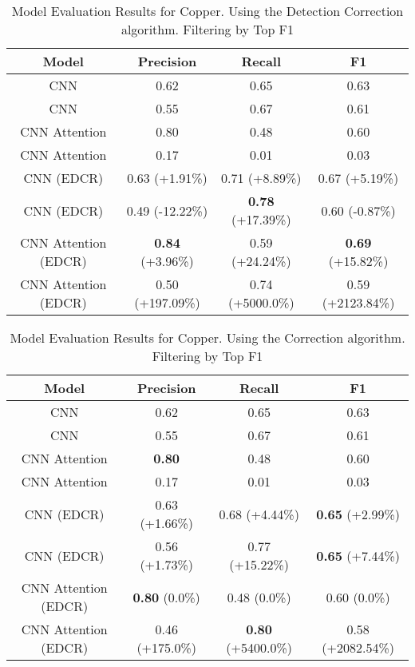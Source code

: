\begin{table}
\centering
\begin{tabular}{|c|c|c|c|}
\hline
Model & Precision & Recall & F1\\
\hline
CNN  & 0.62 & 0.65 & 0.63\\
CNN  & 0.55 & 0.67 & 0.61\\
CNN Attention & 0.80 & 0.48 & 0.60\\
CNN Attention & 0.17 & 0.01 & 0.03\\

\hline
CNN  (EDCR) & 0.63 (+1.91\%) & 0.71 (+8.89\%) & 0.67 (+5.19\%)\\
CNN  (EDCR) & 0.49 (-12.22\%) & \textbf{0.78} (+17.39\%) & 0.60 (-0.87\%)\\
CNN Attention (EDCR) & \textbf{0.84} (+3.96\%) & 0.59 (+24.24\%) & \textbf{0.69} (+15.82\%)\\
CNN Attention (EDCR) & 0.50 (+197.09\%) & 0.74 (+5000.0\%) & 0.59 (+2123.84\%)\\

\hline
\end{tabular}
\caption{Model Evaluation Results for Copper. Using the Detection Correction algorithm. Filtering by Top F1}
\end{table}
\begin{table}
\centering
\begin{tabular}{|c|c|c|c|}
\hline
Model & Precision & Recall & F1\\
\hline
CNN  & 0.62 & 0.65 & 0.63\\
CNN  & 0.55 & 0.67 & 0.61\\
CNN Attention & \textbf{0.80} & 0.48 & 0.60\\
CNN Attention & 0.17 & 0.01 & 0.03\\

\hline
CNN  (EDCR) & 0.63 (+1.66\%) & 0.68 (+4.44\%) & \textbf{0.65} (+2.99\%)\\
CNN  (EDCR) & 0.56 (+1.73\%) & 0.77 (+15.22\%) & \textbf{0.65} (+7.44\%)\\
CNN Attention (EDCR) & \textbf{0.80} (0.0\%) & 0.48 (0.0\%) & 0.60 (0.0\%)\\
CNN Attention (EDCR) & 0.46 (+175.0\%) & \textbf{0.80} (+5400.0\%) & 0.58 (+2082.54\%)\\

\hline
\end{tabular}
\caption{Model Evaluation Results for Copper. Using the Correction algorithm. Filtering by Top F1}
\end{table}
